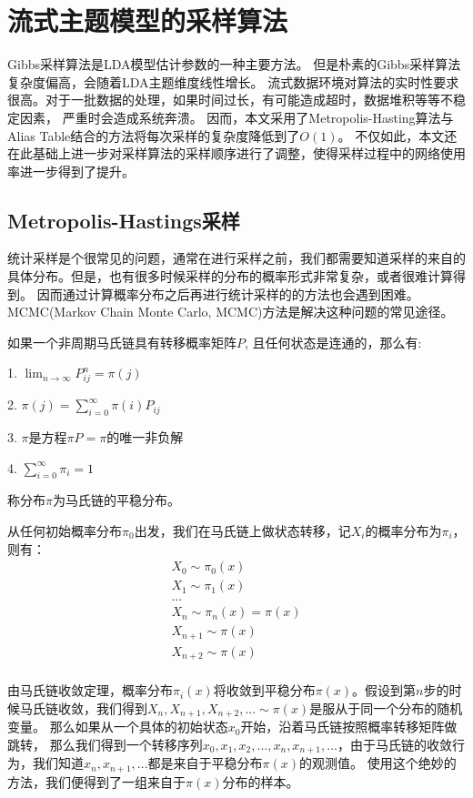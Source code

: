 \chapter{流式主题模型的采样算法}
\label{chapter:sample}
Gibbs采样算法是LDA模型估计参数的一种主要方法。
但是朴素的Gibbs采样算法复杂度偏高，会随着LDA主题维度线性增长。
流式数据环境对算法的实时性要求很高。对于一批数据的处理，如果时间过长，有可能造成超时，数据堆积等等不稳定因素，
严重时会造成系统奔溃。
因而，本文采用了Metropolis-Hasting算法与Alias Table结合的方法将每次采样的复杂度降低到了$O(1)$。
不仅如此，本文还在此基础上进一步对采样算法的采样顺序进行了调整，使得采样过程中的网络使用率进一步得到了提升。

\section{Metropolis-Hastings采样}
统计采样是个很常见的问题，通常在进行采样之前，我们都需要知道采样的来自的具体分布。但是，也有很多时候采样的分布的概率形式非常复杂，或者很难计算得到。
因而通过计算概率分布之后再进行统计采样的的方法也会遇到困难。
MCMC(Markov Chain Monte Carlo, MCMC)方法是解决这种问题的常见途径。

\begin{theorem}[马氏链收敛定理]
如果一个非周期马氏链具有转移概率矩阵$P$, 且任何状态是连通的，那么有:

1. $\lim_{n\rightarrow \infty} P_{ij}^n = \pi(j)$

2. $\pi(j) = \sum_{i = 0}^{\infty}{\pi(i)P_{ij}}$

3. $\pi$是方程$\pi P = \pi$的唯一非负解

4. $\sum_{i=0}^{\infty}{\pi_i} =  1$

称分布$\pi$为马氏链的平稳分布。

\end{theorem}

从任何初始概率分布$\pi_0$出发，我们在马氏链上做状态转移，记$X_i$的概率分布为$\pi_i$，则有：
\begin{align*}
X_0 \sim \pi_0(x) \\
X_1 \sim \pi_1(x) \\
... \\
X_n \sim \pi_n(x) = \pi(x) \\
X_{n+1} \sim \pi(x) \\
X_{n+2} \sim \pi(x) \\
\end{align*}

由马氏链收敛定理，概率分布$\pi_i(x)$将收敛到平稳分布$\pi(x)$。假设到第$n$步的时候马氏链收敛，我们得到$X_n, X_{n+1}, X_{n+2}, ... \sim \pi(x)$是服从于同一个分布的随机变量。
那么如果从一个具体的初始状态$x_0$开始，沿着马氏链按照概率转移矩阵做跳转，
那么我们得到一个转移序列$x_0, x_1, x_2, ..., x_n , x_{n+1}, ...$，由于马氏链的收敛行为，我们知道$x_n, x_{n+1}, ...$都是来自于平稳分布$\pi(x)$的观测值。
使用这个绝妙的方法，我们便得到了一组来自于$\pi(x)$分布的样本。

